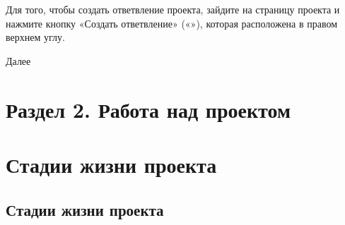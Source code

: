 \documentclass[letterpaper,10pt,russian]{sphinxmanual}
\begin{document}
\sphinxAtStartPar
Для того, чтобы создать ответвление проекта, зайдите на страницу проекта и нажмите кнопку «Создать ответвление» («»), которая расположена в правом верхнем углу.

\sphinxAtStartPar
{}

\sphinxAtStartPar
Далее

\sphinxAtStartPar
{}


\chapter{Раздел 2. Работа над проектом}
\label{\detokenize{index:id7}}

\chapter{Стадии жизни проекта}
\label{\detokenize{index:id8}}
\sphinxstepscope


\section{Стадии жизни проекта}
\label{\detokenize{educational_materials/stages/content:id1}}\label{\detokenize{educational_materials/stages/content::doc}}
\end{document}
